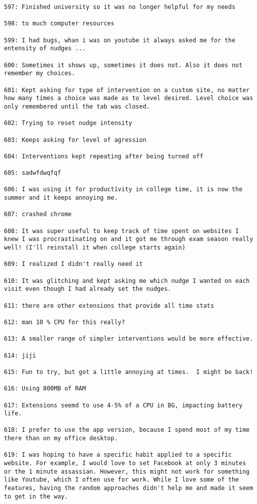 \begin{lstlisting}[breaklines]
597: Finished university so it was no longer helpful for my needs

598: to much computer resources

599: I had bugs, whan i was on youtube it always asked me for the entensity of nudges ...

600: Sometimes it shows up, sometimes it does not. Also it does not remember my choices.

601: Kept asking for type of intervention on a custom site, no matter how many times a choice was made as to level desired. Level choice was only remembered until the tab was closed.

602: Trying to reset nudge intensity

603: Keeps asking for level of agression

604: Interventions kept repeating after being turned off

605: sadwfdwqfqf

606: I was using it for productivity in college time, it is now the summer and it keeps annoying me.

607: crashed chrome

608: It was super useful to keep track of time spent on websites I knew I was procrastinating on and it got me through exam season really well! (I'll reinstall it when college starts again)

609: I realized I didn't really need it

610: It was glitching and kept asking me which nudge I wanted on each visit even though I had already set the nudges.

611: there are other extensions that provide all time stats

612: man 10 % CPU for this really?

613: A smaller range of simpler interventions would be more effective.

614: jiji

615: Fun to try, but got a little annoying at times.  I might be back!

616: Using 800MB of RAM

617: Extensions seemd to use 4-5% of a CPU in BG, impacting battery life.

618: I prefer to use the app version, because I spend most of my time there than on my office desktop.

619: I was hoping to have a specific habit applied to a specific website. For example, I would love to set Facebook at only 3 minutes or the 1 minute assassian. However, this might not work for something like Youtube, which I often use for work. While I love some of the features, having the random approaches didn't help me and made it seem to get in the way.


\end{lstlisting}
